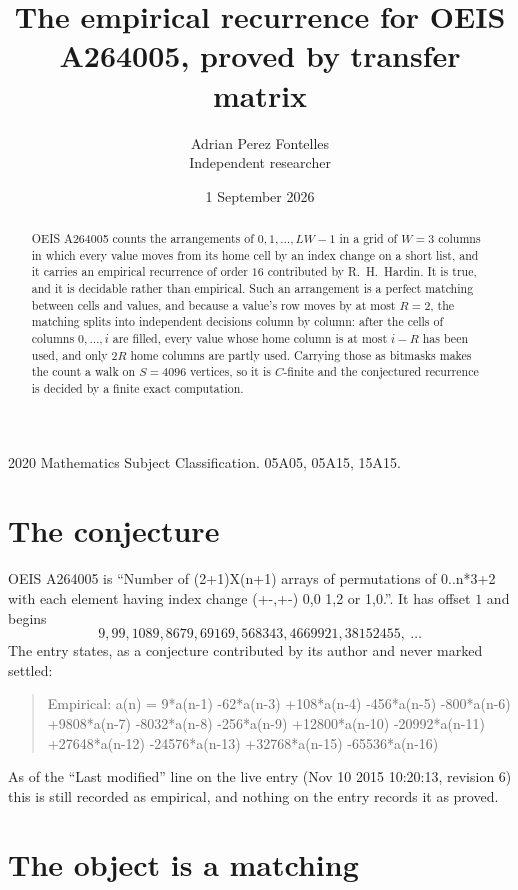 \documentclass[11pt,a4paper]{article}
\title{The empirical recurrence for OEIS A264005, proved by transfer matrix}
\author{Adrian Perez Fontelles\\ \small Independent researcher}
\date{1 September 2026}
\theoremstyle{plain}
\theoremstyle{definition}
\begin{document}
\maketitle

\begin{abstract}
OEIS A264005 counts the arrangements of $0,1,\dots,LW-1$ in a grid of $W=3$ columns in which
every value moves from its home cell by an index change on a short list, and it carries an
empirical recurrence of order $16$ contributed by R.~H.~Hardin. It is true, and it is
decidable rather than empirical. Such an arrangement is a perfect matching between cells and
values, and because a value's row moves by at most $R=2$, the matching splits into
independent decisions column by column: after the cells of columns $0,\dots,i$ are filled,
every value whose home column is at most $i-R$ has been used, and only $2R$ home columns are
partly used. Carrying those as bitmasks makes the count a walk on $S=4096$ vertices, so it is
$C$-finite and the conjectured recurrence is decided by a finite exact computation.
\end{abstract}

\noindent\small 2020 Mathematics Subject Classification. 05A05, 05A15, 15A15.\normalsize

\section{The conjecture}

OEIS A264005 is ``Number of (2+1)X(n+1) arrays of permutations of 0..n*3+2 with each element having index change (+-,+-) 0,0 1,2 or 1,0.''. It has offset $1$ and begins
\[
9, 99, 1089, 8679, 69169, 568343, 4669921, 38152455,\ \dots
\]
The entry states, as a conjecture contributed by its author and never marked settled:
\begin{quote}
Empirical: a(n) = 9*a(n-1) -62*a(n-3) +108*a(n-4) -456*a(n-5) -800*a(n-6) +9808*a(n-7) -8032*a(n-8) -256*a(n-9) +12800*a(n-10) -20992*a(n-11) +27648*a(n-12) -24576*a(n-13) +32768*a(n-15) -65536*a(n-16)
\end{quote}
As of the ``Last modified'' line on the live entry (Nov 10 2015 10:20:13, revision 6) this is still
recorded as empirical, and nothing on the entry records it as proved.

\section{The object is a matching}
\end{document}
